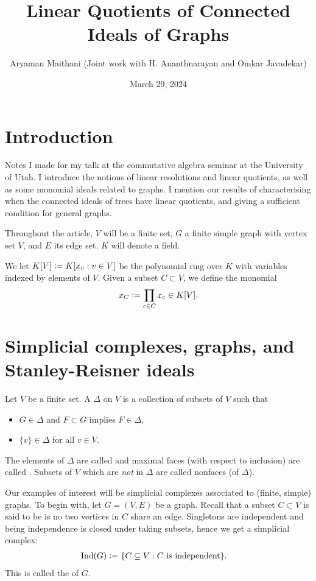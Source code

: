 \documentclass[12pt]{article}
\title{Linear Quotients of Connected Ideals of Graphs}
\author{Aryaman Maithani (Joint work with H. Ananthnarayan and Omkar Javadekar)}
\date{March 29, 2024}
\begin{document}
\maketitle

\section{Introduction}

Notes I made for my talk at the commutative algebra seminar at the University of Utah. I introduce the notions of linear resolutions and linear quotients, as well as some monomial ideals related to graphs. I mention our results of characterising when the connected ideals of trees have linear quotients, and giving a sufficient condition for general graphs. 

Throughout the article, $V$ will be a finite set, $G$ a finite simple graph with vertex set $V$, and $E$ its edge set. $K$ will denote a field.

We let $K[V] \vcentcolon= K[x_{v} : v \in V]$ be the polynomial ring over $K$ with variables indexed by elements of $V$. Given a subset $C \subset V$, we define the monomial
\begin{equation*} 
	x_{C} \vcentcolon= \prod_{c \in C} x_{c} \in K[V].
\end{equation*}

\section{Simplicial complexes, graphs, and Stanley-Reisner ideals}

Let $V$ be a finite set. A  $\Delta$ on $V$ is a collection of subsets of $V$ such that 
\begin{itemize}
	\item $G \in \Delta$ and $F \subset G$ implies $F \in \Delta$,
	\item $\{v\} \in \Delta$ for all $v \in V$.
\end{itemize}

The elements of $\Delta$ are called  and maximal faces (with respect to inclusion) are called . Subsets of $V$ which are \emph{not} in $\Delta$ are called nonfaces (of $\Delta$).

\begin{ex}
	Our examples of interest will be simplicial complexes associated to (finite, simple) graphs. To begin with, let $G = (V, E)$ be a graph. Recall that a subset $C \subset V$ is said to be  is no two vertices in $C$ share an edge. Singletons are independent and being independence is closed under taking subsets, hence we get a simplicial complex:
	\begin{align*} 
		\operatorname{Ind}(G) \vcentcolon=&\ \{C \subseteq V : C \text{ is independent}\}.
	\end{align*}
	This is called the  of $G$.
\end{ex}
\end{document}
